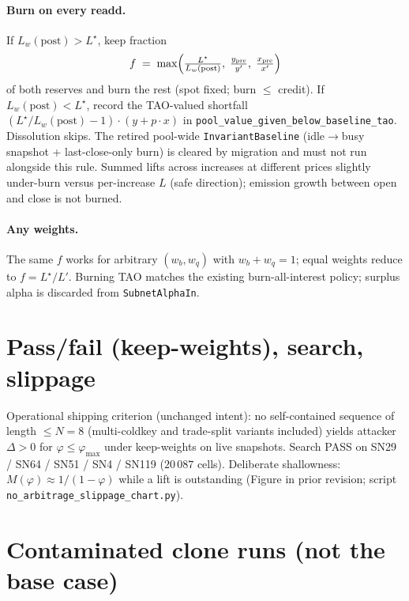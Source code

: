 \documentclass[11pt]{article}
\theoremstyle{definition}
\theoremstyle{remark}
\begin{document}
\paragraph{Burn on every readd.}
If $L_w(\mathrm{post})>L^\star$, keep fraction
\[
  f
  \;=\;
  \max\Bigl(
    \tfrac{L^\star}{L_w(\mathrm{post})},\;
    \tfrac{y_{\mathrm{pre}}}{y'},\;
    \tfrac{x_{\mathrm{pre}}}{x'}
  \Bigr)
\]
of both reserves and burn the rest (spot fixed; burn $\le$ credit).
If $L_w(\mathrm{post})<L^\star$, record the TAO-valued shortfall
$(L^\star/L_w(\mathrm{post})-1)\cdot(y+p\cdot x)$ in
\texttt{pool\_value\_given\_below\_baseline\_tao}. Dissolution skips.
The retired pool-wide \texttt{InvariantBaseline} (idle$\to$busy snapshot
+ last-close-only burn) is cleared by migration and must not run
alongside this rule. Summed lifts across increases at different prices
slightly under-burn versus per-increase $L$ (safe direction); emission
growth between open and close is not burned.

\paragraph{Any weights.}
The same $f$ works for arbitrary $(w_b,w_q)$ with $w_b+w_q=1$;
equal weights reduce to $f=L^\star/L'$. Burning TAO matches the
existing burn-all-interest policy; surplus alpha is discarded from
\texttt{SubnetAlphaIn}.

\section{Pass/fail (keep-weights), search, slippage}
\label{sec:criterion}

Operational shipping criterion (unchanged intent): no self-contained
sequence of length $\le N=8$ (multi-coldkey and trade-split variants
included) yields attacker $\Delta>0$ for $\varphi\le\varphi_{\max}$ under
keep-weights on live snapshots. Search PASS on SN29 / SN64 / SN51 / SN4 /
SN119 ($20\,087$ cells). Deliberate shallowness:
$M(\varphi)\approx 1/(1-\varphi)$ while a lift is outstanding
(Figure in prior revision; script
\texttt{no\_arbitrage\_slippage\_chart.py}).

\appendix
\section{Contaminated clone runs (not the base case)}
\label{app:contaminated}
\end{document}
